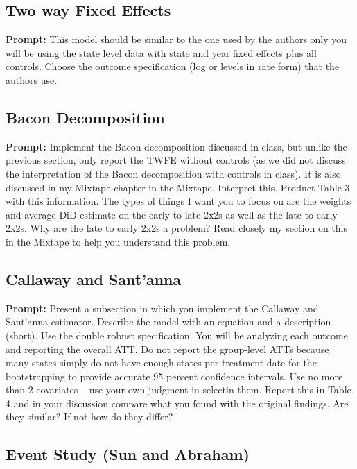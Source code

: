 \documentclass{article}
\begin{document}
	\subsection{Two way Fixed Effects}
	
	\textbf{Prompt: } This model should be similar to the one used by the authors only you will be using the state level data with state and year fixed effects plus all controls.  Choose the outcome specification (log or levels in rate form) that the authors use.
	
	
	
	\subsection{Bacon Decomposition}
	
	\textbf{Prompt: } Implement the Bacon decomposition discussed in class, but unlike the previous section, only report the TWFE without controls (as we did not discuss the interpretation of the Bacon decomposition with controls in class).  It is also discussed in my Mixtape chapter in the Mixtape.  Interpret this.  Product Table 3 with this information.  The types of things I want you to focus on are the weights and average DiD estimate on the early to late 2x2s as well as the late to early 2x2s. Why are the late to early 2x2s a problem?  Read closely my section on this in the Mixtape to help you understand this problem.  
	
	\subsection{Callaway and Sant'anna}
	
	\textbf{Prompt: } Present a subsection in which you implement the Callaway and Sant’anna estimator.  Describe the model with an equation and a description (short). Use the double robust specification. You will be analyzing each outcome and reporting the overall ATT.  Do not report the group-level ATTs because many states simply do not have enough states per treatment date for the bootstrapping to provide accurate 95 percent confidence intervals.  Use no more than 2 covariates – use your own judgment in selectin them. Report this in Table 4 and in your discussion compare what you found with the original findings.  Are they similar?  If not how do they differ?
	
	\subsection{Event Study (Sun and Abraham)}
\end{document}
